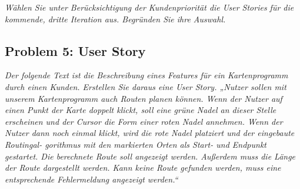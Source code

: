 \documentclass[
  ngerman,
  DIV=14
]{scrartcl}
\begin{document}
\medskip\noindent
\emph{Wählen Sie unter Berücksichtigung der Kundenpriorität die User Stories für die kommende, dritte Iteration aus. Begründen Sie ihre Auswahl.}

\subsection*{Problem 5: User Story}
\emph{Der folgende Text ist die Beschreibung eines Features für ein Kartenprogramm durch einen Kunden. Erstellen Sie daraus eine User Story.
„Nutzer sollen mit unserem Kartenprogramm auch Routen planen können. Wenn der Nutzer auf einen Punkt der Karte doppelt klickt, soll eine grüne Nadel an dieser Stelle erscheinen und der Cursor die Form einer roten Nadel annehmen. Wenn der Nutzer dann noch einmal klickt, wird die rote Nadel platziert und der eingebaute Routingal- gorithmus mit den markierten Orten als Start- und Endpunkt gestartet. Die berechnete Route soll angezeigt werden. Außerdem muss die Länge der Route dargestellt werden. Kann keine Route gefunden werden, muss eine entsprechende Fehlermeldung angezeigt werden.“}
\end{document}
